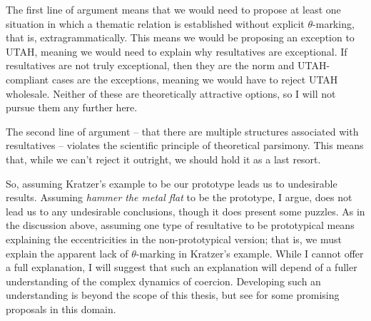 \documentclass[MilwayThesis]{subfiles}
\begin{document}
The first line of argument means that we would need to propose at least one situation in which a thematic relation is established without explicit $\theta$-marking, that is, extragrammatically.
This means we would be proposing an exception to UTAH, meaning we would need to explain why resultatives are exceptional.
If resultatives are not truly exceptional, then they are the norm and UTAH-compliant cases are the exceptions, meaning we would have to reject UTAH wholesale.
Neither of these are theoretically attractive options, so I will not pursue them any further here.

The second line of argument -- that there are multiple structures associated with resultatives -- violates the scientific principle of theoretical parsimony.
This means that, while we can't reject it outright, we should hold it as a last resort.

So, assuming Kratzer's example to be our prototype leads us to undesirable results.
Assuming \textit{hammer the metal flat} to be the prototype, I argue, does not lead us to any undesirable conclusions, though it does present some puzzles.
As in the discussion above, assuming one type of resultative to be prototypical means explaining the eccentricities in the non-prototypical version;
that is, we must explain the apparent lack of $\theta$-marking in Kratzer's example.
While I cannot offer a full explanation, I will suggest that such an explanation will depend of a fuller understanding of the complex dynamics of coercion.
Developing such an understanding is beyond the scope of this thesis, but see \textcite{pustejovsky1998generative} for some promising proposals in this domain.
\end{document}
